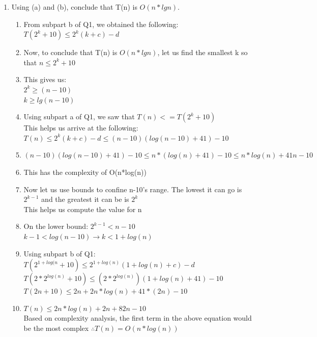 \documentclass[11pt]{article}
\begin{document}
\begin{enumerate}
\begin{enumerate}
        \item Using (a) and (b), conclude that T(n) is $O(n* lg n)$.
        \begin{enumerate}
            \item From subpart b of Q1, we obtained the following:\\
            $T(2^k + 10) \leq 2^k (k + c) - d$
            \item Now, to conclude that T(n) is $O(n* lg n)$, let us find the smallest k so that $n \leq 2^k + 10$
            \item This gives us:\\
            $2^k \geq (n-10)$\\
            $k \geq lg(n-10)$
            \item Using subpart a of Q1, we saw that $T(n) <= T(2^k + 10)$\\
            This helps us arrive at the following:\\
            $T(n) \leq 2^k (k+c) - d \leq (n-10)(log(n-10)+41)-10$
            \item $(n-10)(log(n-10)+41)-10 \leq n*(log(n)+41)-10 \leq n*log(n) + 41n - 10$
            \item This has the complexity of O(n*log(n))
            \item Now let us use bounds to confine n-10's range. The lowest it can go is $2^{k-1}$ and the greatest it can be is $2^k$\\
            This helps us compute the value for n
            \item On the lower bound: $2^{k-1} < n-10$\\
            $k-1 < log(n-10) \rightarrow k < 1 + log(n)$
            \item Using subpart b of Q1:\\
            $T(2^{1 + log(n} + 10) \leq 2^{1+log(n)} (1+log(n)+c)-d$\\
            $T(2*2^{log(n)}+ 10) \leq (2*2^{log(n)})(1 + log(n) + 41)-10$\\
            $T(2n + 10) \leq 2n + 2n*log(n) + 41*(2n)-10$
            \item $T(n) \leq 2n*log(n) + 2n + 82n -10$\\
            Based on complexity analysis, the first term in the above equation would be the most complex
            $\therefore T(n) = O(n*log(n))$
        \end{enumerate}
        

\end{enumerate}
\end{enumerate}
\end{document}
